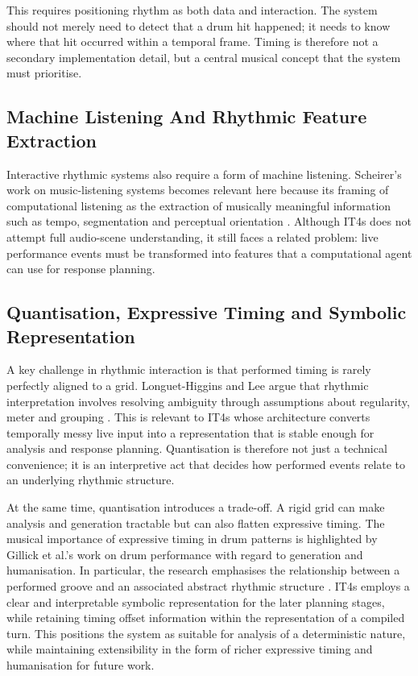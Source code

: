 This requires positioning rhythm as both data and interaction. The
system should not merely need to detect that a drum hit happened; it
needs to know where that hit occurred within a temporal frame. Timing is
therefore not a secondary implementation detail, but a central musical
concept that the system must prioritise.

\subsection{Machine Listening And Rhythmic Feature Extraction}\label{machine-listening-and-rhythmic-feature-extraction}

Interactive rhythmic systems also require a form of machine listening.
Scheirer's work on music-listening systems becomes relevant here because
its framing of computational listening as the extraction of musically
meaningful information such as tempo, segmentation and perceptual
orientation \citep{scheirer2000musiclistening}. Although IT4s does not attempt full
audio-scene understanding, it still faces a related problem: live
performance events must be transformed into features that a
computational agent can use for response planning.

\subsection{Quantisation, Expressive Timing and Symbolic Representation}\label{quantisation-expressive-timing-and-symbolic-representation}

A key challenge in rhythmic interaction is that performed timing is
rarely perfectly aligned to a grid. Longuet-Higgins and Lee argue that
rhythmic interpretation involves resolving ambiguity through assumptions
about regularity, meter and grouping \citep{longuetHiggins1984rhythmic}.
This is relevant to IT4s whose architecture converts temporally messy
live input into a representation that is stable enough for analysis and
response planning. Quantisation is therefore not just a technical
convenience; it is an interpretive act that decides how performed events
relate to an underlying rhythmic structure.

At the same time, quantisation introduces a trade-off. A rigid grid can
make analysis and generation tractable but can also flatten expressive
timing. The musical importance of expressive timing in drum patterns is
highlighted by Gillick et al.'s work on drum performance with regard to
generation and humanisation. In particular, the research emphasises the
relationship between a performed groove and an associated abstract
rhythmic structure \citep{gillick2019learning}. IT4s employs a clear and
interpretable symbolic representation for the later planning stages,
while retaining timing offset information within the representation of a
compiled turn. This positions the system as suitable for analysis of a
deterministic nature, while maintaining extensibility in the form of
richer expressive timing and humanisation for future work.

